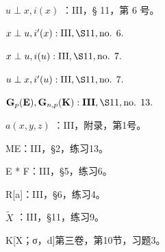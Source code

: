 \(u \perp x, i(x)\) ：III，§ 11，第 6 号。

\(x \perp u, i'(x): \text{III}, \S 11, \text{no. } 6.\)

\(x \perp u, i(u): \text{III}, \S 11, \text{no. } 7.\)

\(u \perp x, i'(u): \text{III}, \S 11, \text{no. } 7.\)

\(\mathbf{G}_p(\mathbf{E}), \mathbf{G}_{n,p}(\mathbf{K}) : \mathbf{III}, \S 11, \text{no. } 13.\)

\(a(x,y,z)\) ：III，附录，第1号。

ME：III，§2，练习13。

E * F：III，§5，练习6。

R{[}a{]}：III，§6，练习4。

\(\tilde{X}\) ：III，§11，练习9。

K{[}X；σ，d{]}第三卷，第10节，习题3。

